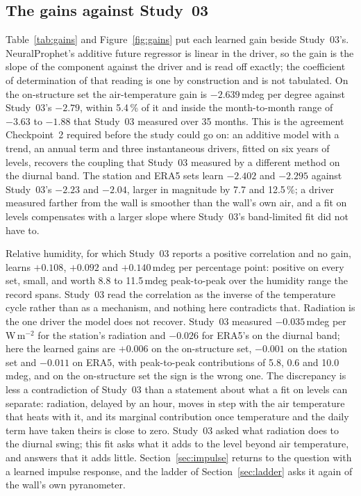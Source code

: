 \documentclass[11pt,a4paper]{article}
\begin{document}
\subsection{The gains against Study~03}

Table~\ref{tab:gains} and Figure~\ref{fig:gains} put each learned gain beside
Study~03's. NeuralProphet's additive future regressor is linear in the driver,
so the gain is the slope of the component against the driver and is read off
exactly; the coefficient of determination of that reading is one by
construction and is not tabulated. On the on-structure set the air-temperature
gain is $-2.639$\,mdeg per degree against Study~03's $-2.79$, within
5.4\,\% of it and inside the month-to-month range of $-3.63$ to $-1.88$ that
Study~03 measured over 35 months. This is the agreement Checkpoint~2 required
before the study could go on: an additive model with a trend, an annual term
and three instantaneous drivers, fitted on six years of levels, recovers the
coupling that Study~03 measured by a different method on the diurnal band.
The station and ERA5 sets learn $-2.402$ and $-2.295$ against Study~03's
$-2.23$ and $-2.04$, larger in magnitude by 7.7 and 12.5\,\%; a driver
measured farther from the wall is smoother than the wall's own air, and a fit
on levels compensates with a larger slope where Study~03's band-limited fit
did not have to.

Relative humidity, for which Study~03 reports a positive correlation and no
gain, learns $+0.108$, $+0.092$ and $+0.140$\,mdeg per percentage point:
positive on every set, small, and worth 8.8 to 11.5\,mdeg peak-to-peak over
the humidity range the record spans. Study~03 read the correlation as the
inverse of the temperature cycle rather than as a mechanism, and nothing here
contradicts that. Radiation is the one driver the model does not recover.
Study~03 measured $-0.035$\,mdeg per W\,m$^{-2}$ for the station's radiation
and $-0.026$ for ERA5's on the diurnal band; here the learned gains are
$+0.006$ on the on-structure set, $-0.001$ on the station set and $-0.011$
on ERA5, with peak-to-peak contributions of 5.8, 0.6 and 10.0\,mdeg, and on
the on-structure set the sign is the wrong one. The discrepancy is less a
contradiction of Study~03 than a statement about what a fit on levels can
separate: radiation, delayed by an hour, moves in step with the air
temperature that heats with it, and its marginal contribution once
temperature and the daily term have taken theirs is close to zero. Study~03
asked what radiation does to the diurnal swing; this fit asks what it adds to
the level beyond air temperature, and answers that it adds little.
Section~\ref{sec:impulse} returns to the question with a learned impulse
response, and the ladder of Section~\ref{sec:ladder} asks it again of the
wall's own pyranometer.
\end{document}
